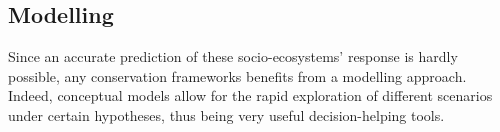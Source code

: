 \documentclass[12pt,a4paper]{article}
\begin{document}
\subsection{Modelling}

Since an accurate prediction of these socio-ecosystems' response is hardly possible, any conservation frameworks benefits from a modelling approach. %
Indeed, conceptual models allow for the rapid exploration of different scenarios under certain hypotheses, thus being very useful decision-helping tools. %
%
\end{document}
